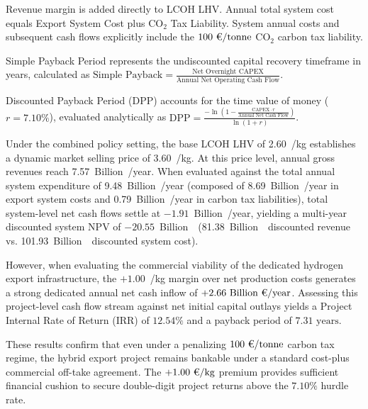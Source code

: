 \documentclass[preprint,12pt]{elsarticle}
\begin{document}
\begin{table}[htbp]
\begin{threeparttable}
\begin{tablenotes}
\footnotesize
\item[*] Revenue margin is added directly to LCOH LHV. Annual total system cost equals Export System Cost plus $\text{CO}_2$ Tax Liability. System annual costs and subsequent cash flows explicitly include the $100\text{~\texteuro/tonne}$ $\text{CO}_2$ carbon tax liability.
\item[a] Simple Payback Period represents the undiscounted capital recovery timeframe in years, calculated as $\text{Simple Payback} = \frac{\text{Net Overnight CAPEX}}{\text{Annual Net Operating Cash Flow}}$.
\item[b] Discounted Payback Period (DPP) accounts for the time value of money ($r = 7.10\%$), evaluated analytically as $\text{DPP} = \frac{-\ln\left(1 - \frac{\text{CAPEX} \cdot r}{\text{Annual Net Cash Flow}}\right)}{\ln(1 + r)}$.
\end{tablenotes}
\end{threeparttable}
\end{table}

Under the combined policy setting, the base LCOH LHV of 2.60~\texteuro/kg establishes a dynamic market selling price of 3.60~\texteuro/kg. At this price level, annual gross revenues reach 7.57~Billion~\texteuro/year. When evaluated against the total annual system expenditure of 9.48~Billion~\texteuro/year (composed of 8.69~Billion~\texteuro/year in export system costs and 0.79~Billion~\texteuro/year in carbon tax liabilities), total system-level net cash flows settle at $-1.91$~Billion~\texteuro/year, yielding a multi-year discounted system NPV of $-20.55$~Billion~\texteuro~(81.38~Billion~\texteuro~discounted revenue vs. 101.93~Billion~\texteuro~discounted system cost).

However, when evaluating the commercial viability of the dedicated hydrogen export infrastructure, the $+1.00$~\texteuro/kg margin over net production costs generates a strong dedicated annual net cash inflow of $+2.66\text{~Billion~\texteuro/year}$. Assessing this project-level cash flow stream against net initial capital outlays yields a Project Internal Rate of Return (IRR) of $12.54\%$ and a payback period of $7.31\text{~years}$.

These results confirm that even under a penalizing $100\text{~\texteuro/tonne}$ carbon tax regime, the hybrid export project remains bankable under a standard cost-plus commercial off-take agreement. The $+1.00\text{~\texteuro/kg}$ premium provides sufficient financial cushion to secure double-digit project returns above the $7.10\%$ hurdle rate.
\end{document}
